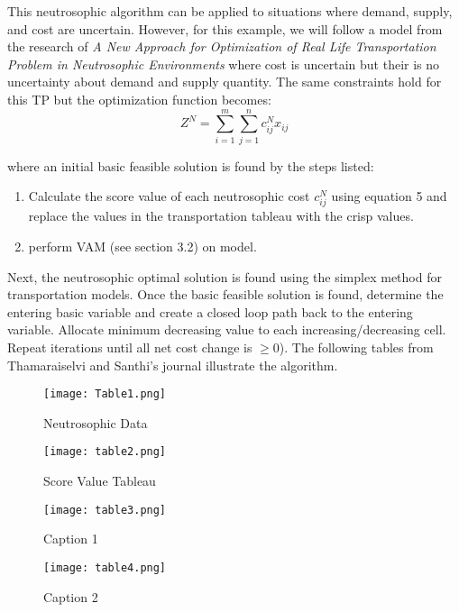 \documentclass{article}
\begin{document}
This neutrosophic algorithm can be applied to situations where demand, supply, and cost are uncertain. However, for this example, we will follow a model from the research of \emph{A New Approach for Optimization of Real Life Transportation Problem in Neutrosophic Environments} where cost is uncertain but their is no uncertainty about demand and supply quantity. The same constraints hold for this TP but the optimization function becomes: 
\begin{equation}
    Z^{N} = \sum\limits_{i=1}^m \sum\limits_{j=1}^n c^{N}_{ij} x_{ij}  
\end{equation}

where an initial basic feasible solution is found by the steps listed:
\begin{enumerate}


\item Calculate the score value of each neutrosophic cost $c^N_{ij}$ using equation 5 and replace the values in the transportation tableau with the crisp values. 
\item perform VAM (see section 3.2) on model. 
\end{enumerate}

Next, the neutrosophic optimal solution is found using the simplex method for transportation models. Once the basic feasible solution is found, determine the entering basic variable and create a closed loop path back to the entering variable. Allocate minimum decreasing value to each increasing/decreasing cell. Repeat iterations until all net cost change is $\geq 0$). The following tables from Thamaraiselvi and Santhi's journal illustrate the algorithm.

\begin{figure}[h]
\centering
   \texttt{[image: Table1.png]}
   \caption{Neutrosophic Data}
   \label{fig:myfig1}

   \texttt{[image: table2.png]}
   \caption{Score Value Tableau}
   \label{fig:myfig2}
  \end{figure} 
  
 \begin{figure}
\centering
   \texttt{[image: table3.png]}
   \caption{Caption 1}
   \label{fig:myfig1}

   \texttt{[image: table4.png]}
   \caption{Caption 2}
   \label{fig:myfig2}
\end{figure}
\end{document}
